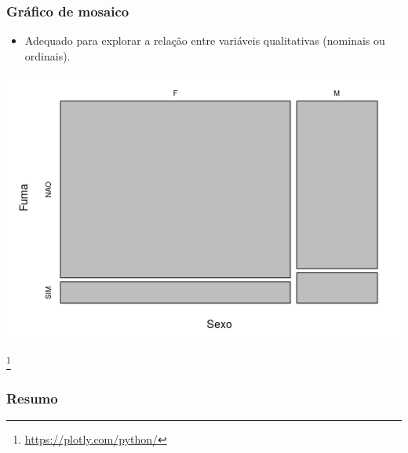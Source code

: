 \documentclass[11pt]{beamer}
\newcommand\blfootnote[1]{%
  \begingroup
  \renewcommand\thefootnote{}\footnote{#1}%
  \addtocounter{footnote}{-1}%
  \endgroup
}
\begin{document}
\begin{frame}
\frametitle{Gráfico de mosaico}

\begin{itemize}
\item
  Adequado para explorar a relação entre variáveis qualitativas
  (nominais ou ordinais).
\end{itemize}

\begin{center}\includegraphics[width=0.6\linewidth]{figs/mosaico} \end{center}
\blfootnote{\url{https://plotly.com/python/}}
\end{frame}

\subsubsection{Resumo}
\end{document}
